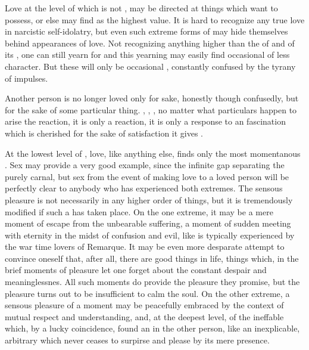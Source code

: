 \pa %
Love at the level of  which is not , may be directed at things which  want to possess, or 
else may find  as the highest value. It is hard to 
recognize any true love in narcistic self-idolatry, but even such 
extreme forms of  may hide themselves behind appearances 
of love. 
Not recognizing anything 
higher than the  of  and  of its 
, one can still yearn for  and this yearning may 
easily find occasional  of less  
character. But these will only be occasional , 
constantly confused by the tyrany of  impulses.

Another person is no longer loved only for  sake, honestly 
though confusedly, but for the sake of some particular thing. , , , no matter what particulars happen to arise the reaction, 
it is only a reaction, it is only a response to an  
fascination which is cherished for the sake of satisfaction it gives 
. 


\pa \imm At the lowest level of , love, like anything
else, finds only the most momentanous .  Sex may
provide a very good example, since the infinite gap separating the
purely carnal,  but  sex from the event of
making love to a loved person will be perfectly clear to anybody who
has experienced both extremes.  The sensous pleasure is not
necessarily  in any higher order of things,
but it is tremendously modified if such a  has taken place. 
On the one extreme, it may be a mere moment of escape from the
unbearable suffering, a moment of sudden meeting with eternity in the
midst of confusion and evil, like is typically experienced by the war
time lovers of Remarque.  It may be even more desparate attempt to
convince oneself that, after all, there are good things in life,
things which, in the brief moments of pleasure let one forget about
the constant despair and meaninglessnes.  All such moments do provide
the pleasure they promise, but the pleasure turns out to be
insufficient to calm the soul.  On the other extreme, a sensous
pleasure of a moment may be peacefully embraced by the context of
mutual respect and understanding, and, at the deepest level, of the
ineffable  which, by a lucky coincidence, found an
 in the other person, like an inexplicable, arbitrary
 which never ceases to surpirse and please by its mere
presence.

